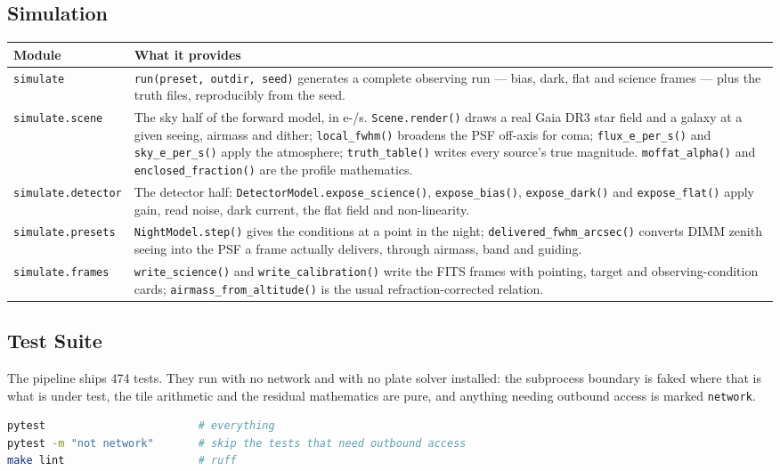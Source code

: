 \documentclass[11pt,a4paper]{article}
\begin{document}
\subsection{Simulation}
\begin{center}
\begin{longtable}{|p{3.6cm}|p{10.9cm}|}
\hline
\textbf{Module} & \textbf{What it provides} \\
\hline
\endhead
\texttt{simulate} & \texttt{run(preset, outdir, seed)} generates a complete observing run --- bias, dark, flat and science frames --- plus the truth files, reproducibly from the seed. \\
\hline
\texttt{simulate.scene} & The sky half of the forward model, in e-/s. \texttt{Scene.render()} draws a real Gaia DR3 star field and a galaxy at a given seeing, airmass and dither; \texttt{local\_fwhm()} broadens the PSF off-axis for coma; \texttt{flux\_e\_per\_s()} and \texttt{sky\_e\_per\_s()} apply the atmosphere; \texttt{truth\_table()} writes every source's true magnitude. \texttt{moffat\_alpha()} and \texttt{enclosed\_fraction()} are the profile mathematics. \\
\hline
\texttt{simulate.detector} & The detector half: \texttt{DetectorModel.expose\_science()}, \texttt{expose\_bias()}, \texttt{expose\_dark()} and \texttt{expose\_flat()} apply gain, read noise, dark current, the flat field and non-linearity. \\
\hline
\texttt{simulate.presets} & \texttt{NightModel.step()} gives the conditions at a point in the night; \texttt{delivered\_fwhm\_arcsec()} converts DIMM zenith seeing into the PSF a frame actually delivers, through airmass, band and guiding. \\
\hline
\texttt{simulate.frames} & \texttt{write\_science()} and \texttt{write\_calibration()} write the FITS frames with pointing, target and observing-condition cards; \texttt{airmass\_from\_altitude()} is the usual refraction-corrected relation. \\
\hline
\end{longtable}
\end{center}

\subsection{Test Suite}
The pipeline ships 474 tests. They run with no network and with no plate solver
installed: the subprocess boundary is faked where that is what is under test,
the tile arithmetic and the residual mathematics are pure, and anything needing
outbound access is marked \texttt{network}.

\begin{lstlisting}[language=bash]
pytest                        # everything
pytest -m "not network"       # skip the tests that need outbound access
make lint                     # ruff
\end{lstlisting}
\end{document}
